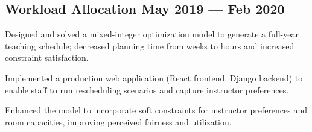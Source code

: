 \subsection{{Workload Allocation \hfill May 2019 --- Feb 2020}}
\begin{zitemize}
    \setlength\itemsep{0.4em}
    \item Designed and solved a mixed-integer optimization model to generate a full-year teaching schedule; decreased planning time from weeks to hours and increased constraint satisfaction.
    \item Implemented a production web application (React frontend, Django backend) to enable staff to run rescheduling scenarios and capture instructor preferences.
    \item Enhanced the model to incorporate soft constraints for instructor preferences and room capacities, improving perceived fairness and utilization.
\end{zitemize}